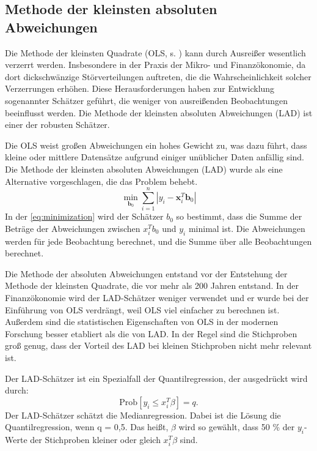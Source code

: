 \subsection{Methode der kleinsten absoluten Abweichungen}
\label{MethodeDerKleinstenAbsolutenAbweichungen}
Die Methode der kleinsten Quadrate (\ac{OLS}, s. ) kann durch Ausreißer wesentlich verzerrt werden. Insbesondere in der Praxis der Mikro- und Finanzökonomie, da dort dickschwänzige Störverteilungen auftreten, die die Wahrscheinlichkeit solcher Verzerrungen erhöhen. Diese Herausforderungen haben zur Entwicklung sogenannter  Schätzer geführt, die weniger von ausreißenden Beobachtungen beeinflusst werden. Die Methode der kleinsten absoluten Abweichungen (\ac{LAD}) ist einer der robusten Schätzer.\par
Die \ac{OLS} weist großen Abweichungen ein hohes Gewicht zu, was dazu führt, dass kleine oder mittlere Datensätze aufgrund einiger unüblicher Daten anfällig sind. Die Methode der kleinsten absoluten Abweichungen (\ac{LAD}) wurde als eine Alternative vorgeschlagen, die das Problem behebt. 
\begin{equation}
\label{eq:minimization}
\min_{\mathbf{b}_0} \sum_{i=1}^{n} \left| y_i - \mathbf{x}_i^T \mathbf{b}_0 \right|
\end{equation}
In der \autoref{eq:minimization} wird der Schätzer \(b_0\) so bestimmt, dass die Summe der Beträge der Abweichungen zwischen \(x_i^Tb_0\) und \(y_i\) minimal ist. Die Abweichungen werden für jede Beobachtung berechnet, und die Summe über alle Beobachtungen berechnet. \par
Die Methode der absoluten Abweichungen entstand vor der Entstehung der Methode der kleinsten Quadrate, die vor mehr als 200 Jahren entstand. In der Finanzökonomie wird der \ac{LAD}-Schätzer weniger verwendet und er wurde bei der Einführung von \ac{OLS} verdrängt, weil \ac{OLS} viel einfacher zu berechnen ist. Außerdem sind die statistischen Eigenschaften von \ac{OLS} in der modernen Forschung besser etabliert als die von \ac{LAD}. In der Regel sind die Stichproben groß genug, dass der Vorteil des \ac{LAD} bei kleinen Stichproben nicht mehr relevant ist. \par
Der \ac{LAD}-Schätzer ist ein Spezialfall der Quantilregression, der ausgedrückt wird durch: 
\begin{equation}
\label{eq:probability}
\text{Prob}[y_i \leq x_i^T\beta] = q.
\end{equation}
Der \ac{LAD}-Schätzer schätzt die Medianregression. Dabei ist die Lösung die Quantilregression, wenn q = 0,5. Das heißt, \(\beta\) wird so gewählt, dass 50 \% der \(y_i\)-Werte der Stichproben kleiner oder gleich \(x_i^T \beta\) sind. 
